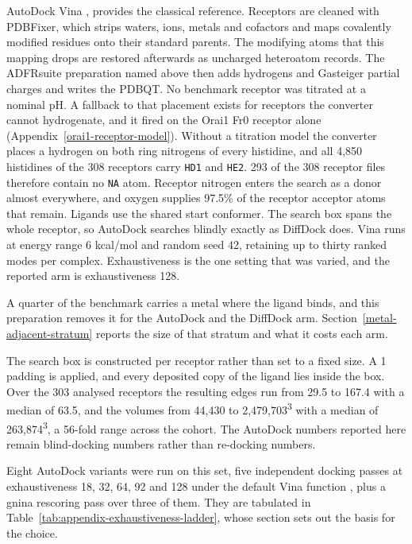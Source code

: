AutoDock Vina \cite{ref022}, \cite{ref023} provides the classical reference. Receptors are cleaned with PDBFixer, which strips waters, ions, metals and cofactors and maps covalently modified residues onto their standard parents. The modifying atoms that this mapping drops are restored afterwards as uncharged heteroatom records. The ADFRsuite preparation named above then adds hydrogens and Gasteiger partial charges and writes the PDBQT. No benchmark receptor was titrated at a nominal pH. A fallback to that placement exists for receptors the converter cannot hydrogenate, and it fired on the Orai1 Fr0 receptor alone (Appendix~\ref{orai1-receptor-model}). Without a titration model the converter places a hydrogen on both ring nitrogens of every histidine, and all 4,850 histidines of the 308 receptors carry \texttt{HD1} and \texttt{HE2}. 293 of the 308 receptor files therefore contain no \texttt{NA} atom. Receptor nitrogen enters the search as a donor almost everywhere, and oxygen supplies 97.5\% of the receptor acceptor atoms that remain. Ligands use the shared start conformer. The search box spans the whole receptor, so AutoDock searches blindly exactly as DiffDock does. Vina runs at energy range 6 kcal/mol and random seed 42, retaining up to thirty ranked modes per complex. Exhaustiveness is the one setting that was varied, and the reported arm is exhaustiveness 128.

A quarter of the benchmark carries a metal where the ligand binds, and this preparation removes it for the AutoDock and the DiffDock arm. Section~\ref{metal-adjacent-stratum} reports the size of that stratum and what it costs each arm.

The search box is constructed per receptor rather than set to a fixed size. A 1\angstrom{} padding is applied, and every deposited copy of the ligand lies inside the box. Over the 303 analysed receptors the resulting edges run from 29.5 to 167.4\angstrom{} with a median of 63.5\angstrom{}, and the volumes from 44,430 to 2,479,703\angstrom{}\textsuperscript{3} with a median of 263,874\angstrom{}\textsuperscript{3}, a 56-fold range across the cohort. The AutoDock numbers reported here remain blind-docking numbers rather than re-docking numbers.

Eight AutoDock variants were run on this set, five independent docking passes at exhaustiveness 18, 32, 64, 92 and 128 under the default Vina function \cite{ref023}, plus a gnina rescoring pass over three of them. They are tabulated in Table~\ref{tab:appendix-exhaustiveness-ladder}, whose section sets out the basis for the choice.

